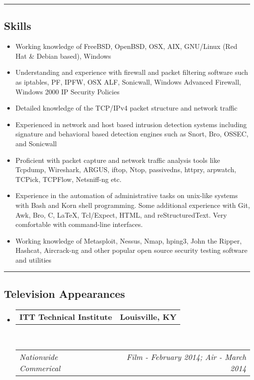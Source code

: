 \documentclass[10pt,letterpaper]{article}
\makeatletter
\newcommand{\headerrow}[2]
{\begin{tabular*}{\linewidth}{l@{\extracolsep{\fill}}r}
	#1 &
	#2 \\
\end{tabular*}}
\makeatother
\begin{document}
\hrule
\vspace{-0.4em}
\subsection*{Skills}

\begin{itemize}
	\parskip=0.1em

	\item Working knowledge of FreeBSD, OpenBSD, OSX, AIX, GNU/Linux (Red Hat \& Debian based), Windows
	\item Understanding and experience with firewall and packet filtering software such as iptables, PF, IPFW, OSX ALF, Sonicwall, Windows Advanced Firewall, Windows 2000 IP Security Policies
	\item Detailed knowledge of the TCP/IPv4 packet structure and network traffic
	\item Experienced in network and host based intrusion detection systems
including signature and behavioral based detection engines such as Snort, Bro, OSSEC, and Sonicwall
	\item Proficient with packet capture and network traffic analysis tools like Tcpdump, Wireshark, ARGUS, iftop, Ntop, passivedns, httpry, arpwatch, TCPick, TCPFlow, Netsniff-ng etc.
	\item Experience in the automation of administrative tasks on unix-like
systems with Bash and Korn shell programming. Some additional experience with Git, Awk, Bro, C, \LaTeX, Tcl/Expect, HTML, and reStructuredText. Very comfortable with command-line interfaces.
	\item Working knowledge of Metasploit, Nessus, Nmap, hping3, John the Ripper, Hashcat, Aircrack-ng and other popular open source security testing software and utilities
\end{itemize}

\hrule
\vspace{-0.4em}
\subsection*{Television Appearances}

\begin{itemize}
	\parskip=0.1em

	\item
	\headerrow
		{\textbf{ITT Technical Institute}}
		{\textbf{Louisville, KY}}
	\\
	\headerrow
		{\emph{Nationwide Commerical}}
		{\emph{Film - February 2014; Air - March 2014}}
\end{itemize}
\end{document}
